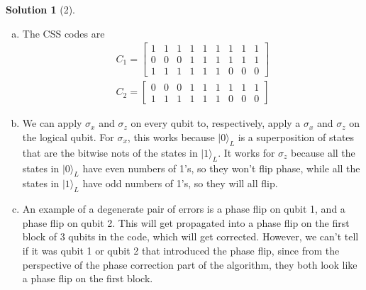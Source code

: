 \documentclass[11pt]{article}
\theoremstyle{definition}
\newtheorem*{solution}{Solution}
\newcommand{\eq}{\begin{equation}\begin{aligned}}
\newcommand{\qe}{\end{aligned}\end{equation}}
\newcommand{\ket}[1]{|#1\rangle}
\newcommand{\mat}{\begin{bmatrix}}
\newcommand{\tam}{\end{bmatrix}}
\begin{document}
\begin{solution}[2]
  \begin{enumerate}[(a)]
    \item The CSS codes are
    \eq
      C_1=\mat
        1&1&1&1&1&1&1&1&1 \\
        0&0&0&1&1&1&1&1&1 \\
        1&1&1&1&1&1&0&0&0 
      \tam\\
      C_2=\mat
        0&0&0&1&1&1&1&1&1 \\
        1&1&1&1&1&1&0&0&0 
      \tam
    \qe
    \item We can apply $\sigma_x$ and $\sigma_z$ on every qubit to, respectively, apply a $\sigma_x$ and $\sigma_z$ on the logical qubit. For $\sigma_x$, this works because $\ket{0}_L$ is a superposition of states that are the bitwise nots of the states in $\ket{1}_L$. It works for $\sigma_z$ because all the states in $\ket{0}_L$ have even numbers of 1's, so they won't flip phase, while all the states in $\ket{1}_L$ have odd numbers of 1's, so they will all flip.
    \item An example of a degenerate pair of errors is a phase flip on qubit 1, and a phase flip on qubit 2. This will get propagated into a phase flip on the first block of 3 qubits in the code, which will get corrected. However, we can't tell if it was qubit 1 or qubit 2 that introduced the phase flip, since from the perspective of the phase correction part of the algorithm, they both look like a phase flip on the first block. 
  \end{enumerate}
\end{solution}
\end{document}

